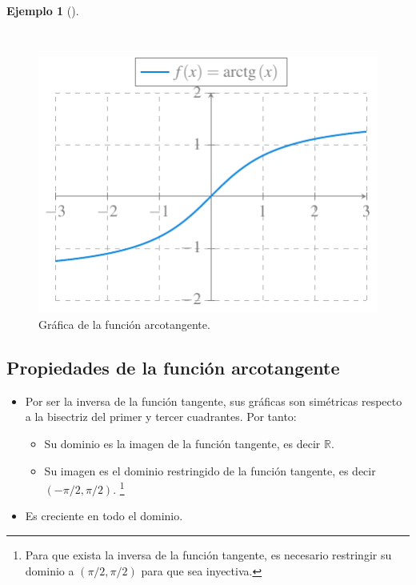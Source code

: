\documentclass[
  a4paper,
]{scrreport}
\providecommand{\tightlist}{%
  \setlength{\itemsep}{0pt}\setlength{\parskip}{0pt}}\usepackage{longtable,booktabs,array}
\theoremstyle{definition}
\newtheorem{example}{Ejemplo}[chapter]
\theoremstyle{plain}
\theoremstyle{definition}
\theoremstyle{definition}
\theoremstyle{plain}
\theoremstyle{plain}
\theoremstyle{remark}
\begin{document}
\begin{example}[]\protect\hypertarget{exm-funcion-arcotangente}{}\label{exm-funcion-arcotangente}

~

\begin{figure}[H]

{\centering \includegraphics{./img/funciones/funcion-arcotangente.pdf}

}

\caption{Gráfica de la función arcotangente.}

\end{figure}%

\end{example}

\subsection{Propiedades de la función
arcotangente}\label{propiedades-de-la-funciuxf3n-arcotangente}

\begin{itemize}
\tightlist
\item
  Por ser la inversa de la función tangente, sus gráficas son simétricas
  respecto a la bisectriz del primer y tercer cuadrantes. Por tanto:

  \begin{itemize}
  \tightlist
  \item
    Su dominio es la imagen de la función tangente, es decir
    \(\mathbb{R}\).
  \item
    Su imagen es el dominio restringido de la función tangente, es decir
    \((-\pi/2,\pi/2)\). \footnote{Para que exista la inversa de la
      función tangente, es necesario restringir su dominio a
      \((\pi/2,\pi/2)\) para que sea inyectiva.}
  \end{itemize}
\item
  Es creciente en todo el dominio.
\end{itemize}
\end{document}
